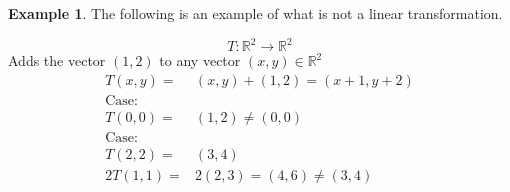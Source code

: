 \documentclass{report}
\theoremstyle{definition}
\newtheorem{ex}{Example}[section]
\theoremstyle{remark}
\begin{document}
\begin{ex}
The following is an example of what is not a linear transformation.

\[T:\mathbb{R}^2\rightarrow\mathbb{R}^2\]
Adds the vector $(1,2)$ to any vector $(x,y)\in\mathbb{R}^2$
\begin{align*}
T(x,y)=&(x,y)+(1,2)=(x+1,y+2) \\
\text{Case: }&\\
T(0,0)=&(1,2)\neq (0,0) \\
\text{Case: }&\\
T(2,2)=&(3,4)\\
2T(1,1)=&2(2,3)=(4,6)\neq (3,4)
\end{align*}
\end{ex}
\end{document}
